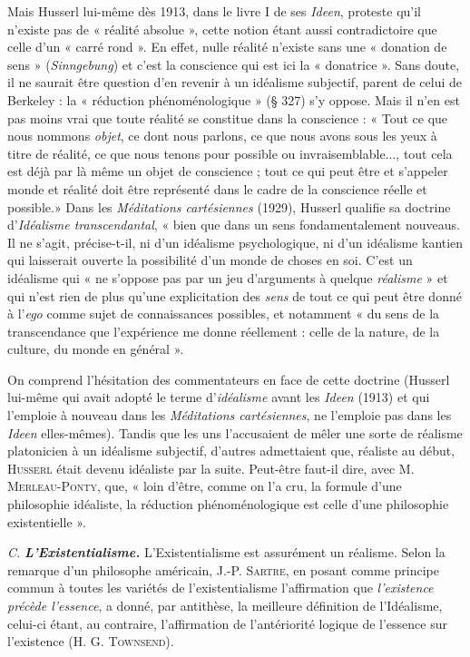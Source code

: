 Mais Husserl lui-même dès 1913, dans le livre I de ses {\it Ideen}, proteste qu'il
n'existe pas de « réalité absolue », cette notion étant aussi contradictoire
que celle d’un « carré rond ». En effet, nulle réalité n'existe sans une « donation
de sens » ({\it Sinngebung}) et c’est la conscience qui est ici la « donatrice ».
Sans doute, il ne saurait être question d’en revenir à un idéalisme subjectif,
parent de celui de Berkeley : la « réduction phénoménologique » (§ 327) s’y
oppose. Mais il n’en est pas moins vrai que toute réalité se constitue dans
la conscience : « Tout ce que nous nommons {\it objet}, ce dont nous parlons,
ce que nous avons sous les yeux à titre de réalité, ce que nous tenons pour
possible ou invraisemblable..., tout cela est déjà par là même un objet de
conscience ; tout ce qui peut être et s'appeler monde et réalité doit être
représenté dans le cadre de la conscience réelle et possible.» Dans les
{\it Méditations cartésiennes} (1929), Husserl qualifie sa doctrine d’\textsf{\textit {Idéalisme
transcendantal}}, « bien que dans un sens fondamentalement nouveaus. Il ne s’agit,
précise-t-il, ni d’un idéalisme psychologique, ni d’un idéalisme kantien
qui laisserait ouverte la possibilité d'un monde de choses en soi. C’est un
idéalisme qui « ne s'oppose pas par un jeu d'arguments à quelque {\it réalisme} »
et qui n’est rien de plus qu’une explicitation des \textsf{\textit {sens}} de tout ce qui peut
être donné à l’{\it ego} comme sujet de connaissances possibles, et notamment
« du sens de la transcendance que l'expérience me donne réellement : celle
de la nature, de la culture, du monde en général ».

On comprend l’hésitation des commentateurs en face de cette
doctrine
{\scriptsize (Husserl lui-même qui avait adopté le terme d'{\it idéalisme} avant les {\it Ideen} (1913)
et qui l'emploie à nouveau dans les {\it Méditations cartésiennes}, ne l'emploie pas dans les
{\it Ideen} elles-mêmes)}.
Tandis que les uns l’accusaient de mêler une sorte de
réalisme platonicien à un idéalisme subjectif, d’autres admettaient
que, réaliste au début, \textsc{Husserl} était devenu idéaliste par la suite.
Peut-être faut-il dire, avec M. \textsc{Merleau-Ponty}, que, « loin d’être,
comme on l’a cru, la formule d’une philosophie idéaliste, la réduction
phénoménologique est celle d’une philosophie existentielle ».

{\it C.} \textbf{\textit {L’Existentialisme.}} L’Existentialisme est assurément un réalisme.
Selon la remarque d’un philosophe américain, J.-P. \textsc{Sartre},
en posant comme principe commun à toutes les variétés de l’existentialisme
l’affirmation que {\it l'existence précède l'essence}, a donné, par
antithèse, la meilleure définition de l’Idéalisme, celui-ci étant, au
contraire, l’affirmation de l’antériorité logique de l’essence sur l’existence
(H. G. \textsc{Townsend}).

